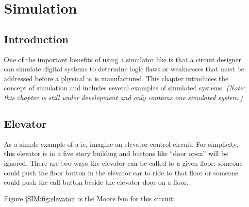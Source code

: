 \chapter{Simulation}\label{ch13}
\section{Introduction}

One of the important benefits of using a simulator like \Le is that a circuit designer can simulate digital systems to determine logic flaws or weaknesses that must be addressed before a physical \gls{ic} is manufactured. This chapter introduces the concept of simulation and includes several examples of simulated systems. \textit{(Note: this chapter is still under development and only contains one simulated system.)}

\section{Elevator}
\label{SIM:sec:elevator}

As a simple example of a \gls{ic}, imagine an elevator control circuit. For simplicity, this elevator is in a five story building and buttons like ``door open'' will be ignored. There are two ways the elevator can be called to a given floor: someone could push the floor button in the elevator car to ride to that floor or someone could push the call button beside the elevator door on a floor.

 Figure \ref{SIM:fig:elevator} is the Moore \gls{fsm} for this circuit:

